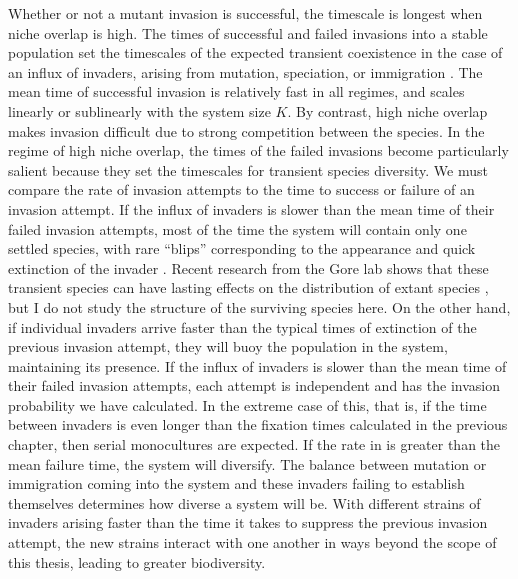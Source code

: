 Whether or not a mutant invasion is successful, the timescale is longest when niche overlap is high. %
The times of successful and failed invasions into a stable population set the timescales of the expected transient coexistence in the case of an influx of invaders, arising from mutation, speciation, or immigration \cite{Hubbell2001,Desai2007,Carroll2015}. 
The mean time of successful invasion is relatively fast in all regimes, and scales linearly or sublinearly with the system size $K$. 
By contrast, high niche overlap makes invasion difficult due to strong competition between the species. 
In the regime of high niche overlap, the times of the failed invasions become particularly salient because they set the timescales for transient species diversity. %
We must compare the rate of invasion attempts to the time to success or failure of an invasion attempt. 
If the influx of invaders is slower than the mean time of their failed invasion attempts, most of the time the system will contain only one settled species, with rare ``blips'' corresponding to the appearance and quick extinction of the invader \cite{Dias1996,Hubbell2001,Chesson2000}. 
Recent research from the Gore lab shows that these transient species can have lasting effects on the distribution of extant species \cite{Amor2019}, but I do not study the structure of the surviving species here. 
On the other hand, if individual invaders arrive faster than the typical times of extinction of the previous invasion attempt, they will buoy the population in the system, maintaining its presence. %
\fi
If the influx of invaders is slower than the mean time of their failed invasion attempts, each attempt is independent and has the invasion probability we have calculated. 
In the extreme case of this, that is, if the time between invaders is even longer than the fixation times calculated in the previous chapter, then serial monocultures are expected.
If the rate in is greater than the mean failure time, the system will diversify. 
The balance between mutation or immigration coming into the system and these invaders failing to establish themselves determines how diverse a system will be. %
With different strains of invaders arising faster than the time it takes to suppress the previous invasion attempt, the new strains interact with one another in ways beyond the scope of this thesis, leading to greater biodiversity. 
